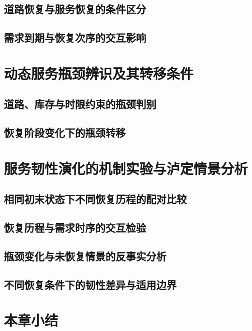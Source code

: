 \subsection{道路恢复与服务恢复的条件区分}
\subsection{需求到期与恢复次序的交互影响}

\ThesisBlank

\section{动态服务瓶颈辨识及其转移条件}
\subsection{道路、库存与时限约束的瓶颈判别}
\subsection{恢复阶段变化下的瓶颈转移}

\ThesisBlank

\section{服务韧性演化的机制实验与泸定情景分析}
\subsection{相同初末状态下不同恢复历程的配对比较}
\subsection{恢复历程与需求时序的交互检验}
\subsection{瓶颈变化与未恢复情景的反事实分析}
\subsection{不同恢复条件下的韧性差异与适用边界}

\ThesisBlank

\section{本章小结}
\ThesisBlank
